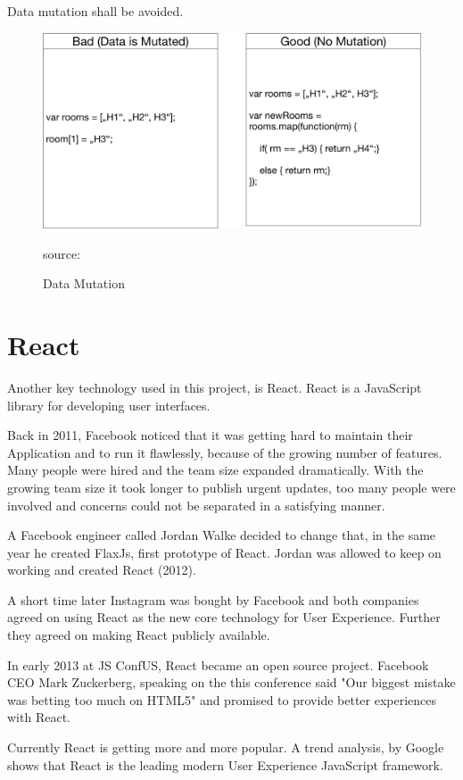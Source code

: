 Data mutation shall be avoided.

\begin{figure}[H]
	\centering
	\includegraphics[width=0.8\linewidth]{bilder/grundlagen/fp2.png}
	\caption{Data Mutation} source:\cite{DM}
	\label{fig:DM}
\end{figure}

\newpage

\section{React}
Another key technology used in this project, is React. React is a JavaScript library for developing user interfaces. 

Back in 2011, Facebook noticed that it was getting hard to maintain their Application and to run it flawlessly, because of the growing number of features. Many people were hired and the team size expanded dramatically. With the growing team size it took longer to publish urgent updates, too many people were involved and concerns could not be separated in a satisfying manner.

A Facebook engineer called Jordan Walke decided to change that, in the same year he created FlaxJs, first prototype of React. Jordan was allowed to keep on working and created React (2012). 

A short time later Instagram was bought by Facebook and both companies agreed on using React as the new core technology for User Experience. Further they agreed on making React publicly available. 

In early 2013 at JS ConfUS, React became an open source project. Facebook CEO Mark Zuckerberg, speaking on the this conference said  "Our biggest mistake was betting too much on HTML5" and promised to provide better experiences with React.

Currently React is getting more and more popular. A trend analysis, by Google shows that React is the leading modern User Experience JavaScript framework.


